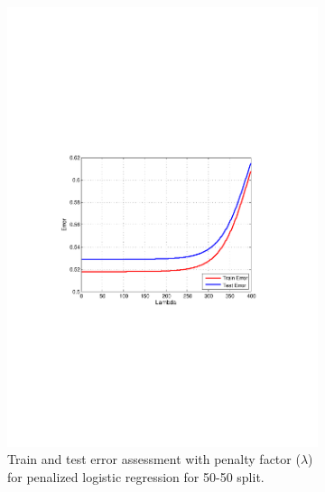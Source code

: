 \begin{figure}[h]
  \begin{subfigure}[b]{0.5\textwidth}
   \includegraphics[clip, trim=4cm 9cm 3cm 10cm, width=\textwidth]{figures/Lambda_pLG.pdf}
    \caption{Train and test error assessment with penalty factor ($\lambda$) for penalized logistic regression
    for 50-50 split.}
    \label{fig:Lambda_pLr}
  \end{subfigure}
  \hfill
  \begin{subfigure}[b]{0.45\textwidth}

\end{subfigure}
\end{figure}

